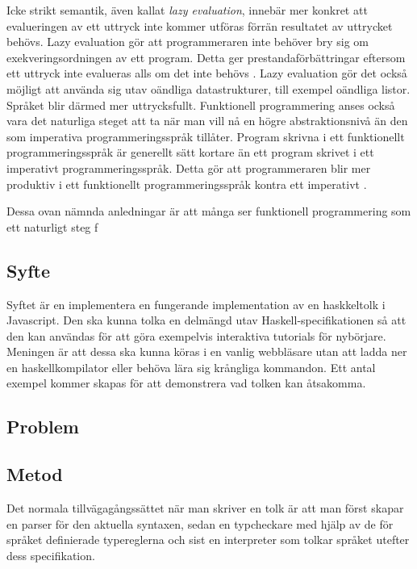 Icke strikt semantik, även kallat \emph{lazy evaluation}, innebär mer konkret att evalueringen av ett uttryck inte kommer utföras förrän resultatet av uttrycket behövs.
Lazy evaluation gör att programmeraren inte behöver bry sig om exekveringsordningen av ett program. Detta ger prestandaförbättringar eftersom ett uttryck inte evalueras alls om det inte behövs \citep{hudak89}.
Lazy evaluation gör det också möjligt att använda sig utav oändliga datastrukturer, till exempel oändliga listor. Språket blir därmed mer uttrycksfullt. 
Funktionell programmering anses också vara det naturliga steget att ta när man vill nå en högre abstraktionsnivå än den som imperativa programmeringsspråk tillåter. Program skrivna i ett funktionellt programmeringsspråk är generellt sätt kortare än ett program skrivet i ett imperativt programmeringsspråk. Detta gör att programmeraren blir mer produktiv i ett funktionellt programmeringsspråk kontra ett imperativt \citep{why}.


Dessa ovan nämnda anledningar är att många ser funktionell programmering som ett naturligt steg f

\subsection{Syfte}
Syftet är en implementera en fungerande implementation av en haskkeltolk i Javascript. Den ska kunna tolka en delmängd utav Haskell-specifikationen så att den kan användas för att göra exempelvis interaktiva tutorials för nybörjare.
Meningen är att dessa ska kunna köras i en vanlig webbläsare utan att ladda ner en haskellkompilator eller behöva lära sig krångliga kommandon.
Ett antal exempel kommer skapas för att demonstrera vad tolken kan åtsakomma. 

\subsection{Problem} 

\subsection{Metod} 
Det normala tillvägagångssättet när man skriver en tolk är att man först
skapar en parser för den aktuella syntaxen, sedan en typcheckare med 
hjälp av de för språket definierade typereglerna och sist en interpreter
som tolkar språket utefter dess specifikation.

